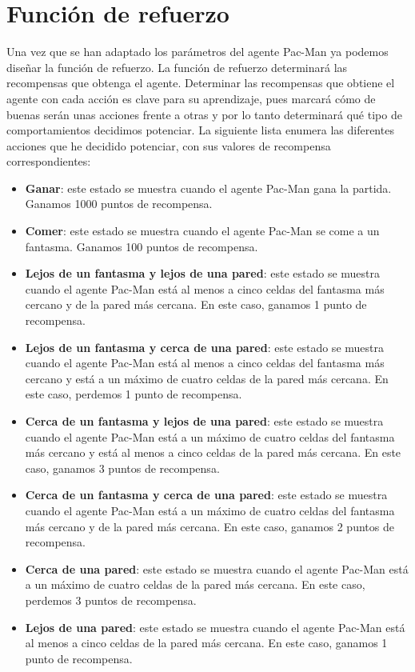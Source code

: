 \documentclass[11pt]{exam}
\begin{document}
\section{Función de refuerzo}\label{refuerzo}

Una vez que se han adaptado los parámetros del agente Pac-Man ya podemos diseñar la función de refuerzo. La función de refuerzo determinará las recompensas que obtenga el agente. Determinar las recompensas que obtiene el agente con cada acción es clave para su aprendizaje, pues marcará cómo de buenas serán unas acciones frente a otras y por lo tanto determinará qué tipo de comportamientos decidimos potenciar. La siguiente lista enumera las diferentes acciones que he decidido potenciar, con sus valores de recompensa correspondientes:

\begin{itemize}
	\item \textbf{Ganar}: este estado se muestra cuando el agente Pac-Man gana la partida. Ganamos 1000 puntos de recompensa.
	
	\item \textbf{Comer}: este estado se muestra cuando el agente Pac-Man se come a un fantasma. Ganamos 100 puntos de recompensa.
	
	\item \textbf{Lejos de un fantasma y lejos de una pared}: este estado se muestra cuando el agente Pac-Man está al menos a cinco celdas del fantasma más cercano y de la pared más cercana. En este caso, ganamos 1 punto de recompensa.
	
	\item \textbf{Lejos de un fantasma y cerca de una pared}: este estado se muestra cuando el agente Pac-Man está al menos a cinco celdas del fantasma más cercano y está a un máximo de cuatro celdas de la pared más cercana. En este caso, perdemos 1 punto de recompensa.
	
	\item \textbf{Cerca de un fantasma y lejos de una pared}: este estado se muestra cuando el agente Pac-Man está a un máximo de cuatro celdas del fantasma más cercano y está al menos a cinco celdas de la pared más cercana.  En este caso, ganamos 3 puntos de recompensa.
	
	\item \textbf{Cerca de un fantasma y cerca de una pared}: este estado se muestra cuando el agente Pac-Man está a un máximo de cuatro celdas del fantasma más cercano y de la pared más cercana. En este caso, ganamos 2 puntos de recompensa.
	
	\item \textbf{Cerca de una pared}: este estado se muestra cuando el agente Pac-Man está a un máximo de cuatro celdas de la pared más cercana. En este caso, perdemos 3 puntos de recompensa.
	
	\item \textbf{Lejos de una pared}: este estado se muestra cuando el agente Pac-Man está al menos a cinco celdas de la pared más cercana. En este caso, ganamos 1 punto de recompensa.
\end{itemize}
\end{document}
